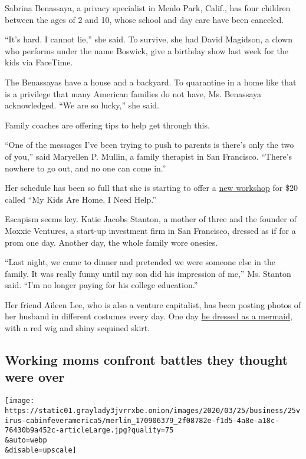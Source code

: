 Sabrina Benassaya, a privacy specialist in Menlo Park, Calif., has four
children between the ages of 2 and 10, whose school and day care have
been canceled.

``It's hard. I cannot lie,'' she said. To survive, she had David
Magidson, a clown who performs under the name Boswick, give a birthday
show last week for the kids via FaceTime.

The Benassayas have a house and a backyard. To quarantine in a home like
that is a privilege that many American families do not have, Ms.
Benassaya acknowledged. ``We are so lucky,'' she said.

Family coaches are offering tips to help get through this.

``One of the messages I've been trying to push to parents is there's
only the two of you,'' said Maryellen P. Mullin, a family therapist in
San Francisco. ``There's nowhere to go out, and no one can come in.''

Her schedule has been so full that she is starting to offer a
\href{http://messyparenting.com}{new workshop} for \$20 called ``My Kids
Are Home, I Need Help.''

Escapism seems key. Katie Jacobs Stanton, a mother of three and the
founder of Moxxie Ventures, a start-up investment firm in San Francisco,
dressed as if for a prom one day. Another day, the whole family wore
onesies.

``Last night, we came to dinner and pretended we were someone else in
the family. It was really funny until my son did his impression of me,''
Ms. Stanton said. ``I'm no longer paying for his college education.''

Her friend Aileen Lee, who is also a venture capitalist, has been
posting photos of her husband in different costumes every day. One day
\href{https://twitter.com/aileenlee/status/1241144621297614848}{he
dressed as a mermaid}, with a red wig and shiny sequined skirt.

\hypertarget{working-moms-confront-battles-they-thought-were-over}{%
\subsection{Working moms confront battles they thought were
over}\label{working-moms-confront-battles-they-thought-were-over}}

\texttt{[image: https://static01.graylady3jvrrxbe.onion/images/2020/03/25/business/25virus-cabinfeveramerica5/merlin\_170906379\_2f08782e-f1d5-4a8e-a18c-76430b9a452c-articleLarge.jpg?quality=75\\\&auto=webp\\\&disable=upscale]}

